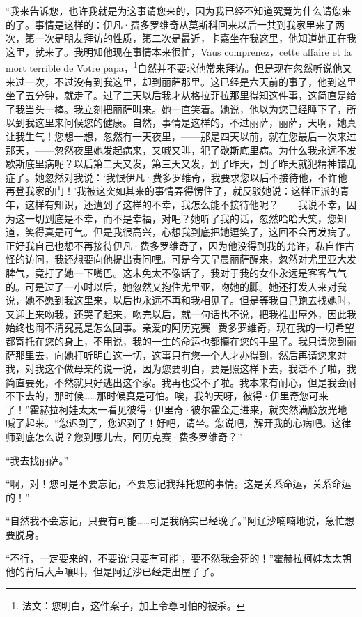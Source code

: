 \par “我来告诉您，也许我就是为这事请您来的，因为我已经不知道究竟为什么请您来的了。事情是这样的：伊凡·费多罗维奇从莫斯科回来以后一共到我家里来了两次，第一次是朋友拜访的性质，第二次是最近，卡嘉坐在我这里，他知道她正在我这里，就来了。我明知他现在事情本来很忙，Vaus comprenez，cette affaire et la mort terrible de Votre papa，\footnote{法文：您明白，这件案子，加上令尊可怕的被杀。}自然并不要求他常来拜访。但是现在忽然听说他又来过一次，不过没有到我这里，却到丽萨那里。这已经是六天前的事了，他到这里坐了五分钟，就走了。过了三天以后我才从格拉菲拉那里得知这件事，这简直是给了我当头一棒。我立刻把丽萨叫来。她一直笑着。她说，他以为您已经睡下了，所以到我这里来问候您的健康。自然，事情是这样的，不过丽萨，丽萨，天啊，她真让我生气！您想一想，忽然有一天夜里，——那是四天以前，就在您最后一次来过那天，——忽然夜里她发起病来，又喊又叫，犯了歇斯底里病。为什么我永远不发歇斯底里病呢？以后第二天又发，第三天又发，到了昨天，到了昨天就犯精神错乱症了。她忽然对我说：‘我恨伊凡·费多罗维奇，我要求您以后不接待他，不许他再登我家的门！’我被这突如其来的事情弄得愣住了，就反驳她说：这样正派的青年，这样有知识，还遭到了这样的不幸，我怎么能不接待他呢？——我说不幸，因为这一切到底是不幸，而不是幸福，对吧？她听了我的话，忽然哈哈大笑，您知道，笑得真是可气。但是我很高兴，心想我到底把她逗笑了，这回不会再发病了。正好我自己也想不再接待伊凡·费多罗维奇了，因为他没得到我的允许，私自作古怪的访问，我还想要向他提出责问哩。可是今天早晨丽萨醒来，忽然对尤里亚大发脾气，竟打了她一下嘴巴。这未免太不像话了，我对于我的女仆永远是客客气气的。可是过了一小时以后，她忽然又抱住尤里亚，吻她的脚。她还打发人来对我说，她不愿到我这里来，以后也永远不再和我相见了。但是等我自己跑去找她时，又迎上来吻我，还哭了起来，吻完以后，就一句话也不说，把我推出屋外，因此我始终也闹不清究竟是怎么回事。亲爱的阿历克赛·费多罗维奇，现在我的一切希望都寄托在您的身上，不用说，我的一生的命运也都攥在您的手里了。我只请您到丽萨那里去，向她打听明白这一切，这事只有您一个人才办得到，然后再请您来对我，对我这个做母亲的说一说，因为您要明白，要是照这样下去，我活不了啦，我简直要死，不然就只好逃出这个家。我再也受不了啦。我本来有耐心，但是我会耐不下去的，那时候……那时候真是可怕。唉，我的天呀，彼得·伊里奇您可来了！”霍赫拉柯娃太太一看见彼得·伊里奇·彼尔霍金走进来，就突然满脸放光地喊了起来。“您迟到了，您迟到了！好吧，请坐。您说吧，解开我的心病吧。这律师到底怎么说？您到哪儿去，阿历克赛·费多罗维奇？”
\par “我去找丽萨。”
\par “啊，对！您可是不要忘记，不要忘记我拜托您的事情。这是关系命运，关系命运的！”
\par “自然我不会忘记，只要有可能……可是我确实已经晚了。”阿辽沙喃喃地说，急忙想要脱身。
\par “不行，一定要来的，不要说‘只要有可能’，要不然我会死的！”霍赫拉柯娃太太朝他的背后大声嚷叫，但是阿辽沙已经走出屋子了。
